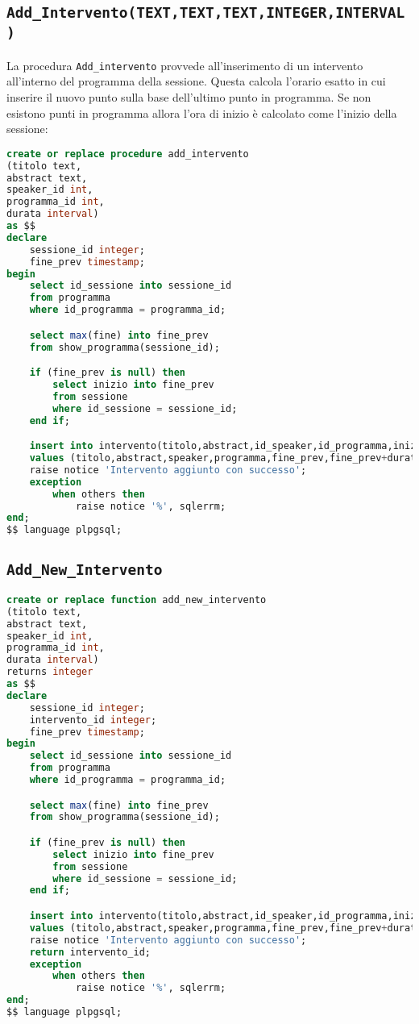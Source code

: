 \subsection{\texttt{Add\_Intervento(TEXT,TEXT,TEXT,INTEGER,INTERVAL)}}
La procedura \texttt{Add\_intervento} provvede all'inserimento di un intervento all'interno del programma della sessione. Questa calcola l'orario esatto in cui inserire il nuovo punto sulla base dell'ultimo punto in programma. Se non esistono punti in programma allora l'ora di inizio è calcolato come l'inizio della sessione:
\begin{lstlisting}[language=SQL,style=mystyle]
create or replace procedure add_intervento
(titolo text, 
abstract text, 
speaker_id int, 
programma_id int,
durata interval)
as $$
declare
    sessione_id integer;
    fine_prev timestamp;
begin
    select id_sessione into sessione_id
    from programma
    where id_programma = programma_id;

    select max(fine) into fine_prev
    from show_programma(sessione_id);

    if (fine_prev is null) then
        select inizio into fine_prev
        from sessione
        where id_sessione = sessione_id;
    end if;

    insert into intervento(titolo,abstract,id_speaker,id_programma,inizio,fine)
    values (titolo,abstract,speaker,programma,fine_prev,fine_prev+durata);
    raise notice 'Intervento aggiunto con successo';
    exception
        when others then
            raise notice '%', sqlerrm;
end;
$$ language plpgsql;
\end{lstlisting}

\subsection{\texttt{Add\_New\_Intervento}}
\begin{lstlisting}[language=SQL,style=mystyle]
create or replace function add_new_intervento 
(titolo text, 
abstract text, 
speaker_id int, 
programma_id int,
durata interval)
returns integer
as $$
declare
    sessione_id integer;
    intervento_id integer;
    fine_prev timestamp;
begin
    select id_sessione into sessione_id
    from programma
    where id_programma = programma_id;

    select max(fine) into fine_prev
    from show_programma(sessione_id);

    if (fine_prev is null) then
        select inizio into fine_prev
        from sessione
        where id_sessione = sessione_id;
    end if;

    insert into intervento(titolo,abstract,id_speaker,id_programma,inizio,fine)
    values (titolo,abstract,speaker,programma,fine_prev,fine_prev+durata) returning id_intervento into intervento_id;
    raise notice 'Intervento aggiunto con successo';
    return intervento_id;
    exception
        when others then
            raise notice '%', sqlerrm;
end;
$$ language plpgsql;
\end{lstlisting}
